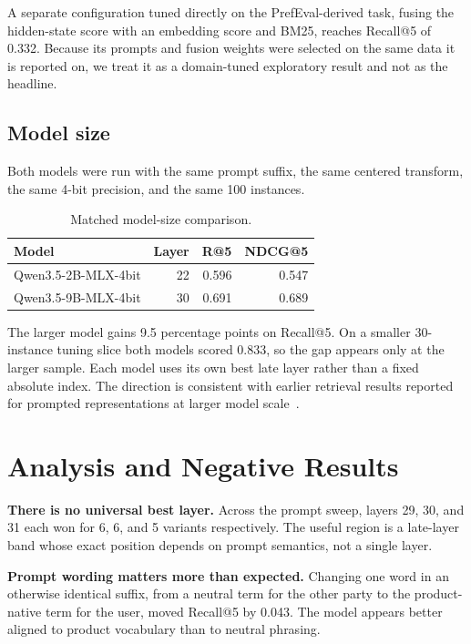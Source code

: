 \documentclass[
  10pt,
  letterpaper,
]{article}
\begin{document}
A separate configuration tuned directly on the PrefEval-derived task,
fusing the hidden-state score with an embedding score and BM25, reaches
Recall@5 of 0.332. Because its prompts and fusion weights were selected
on the same data it is reported on, we treat it as a domain-tuned
exploratory result and not as the headline.

\subsection{Model size}\label{model-size}

Both models were run with the same prompt suffix, the same centered
transform, the same 4-bit precision, and the same 100 instances.

\begin{table}[htbp]
\centering
\small
\caption{Matched model-size comparison.}
\label{tab:model-size}
\begin{tabularx}{0.8\linewidth}{@{}Xrrr@{}}
\toprule
Model & Layer & R@5 & NDCG@5 \\
\midrule
Qwen3.5-2B-MLX-4bit & 22 & 0.596 & 0.547 \\
Qwen3.5-9B-MLX-4bit & 30 & 0.691 & 0.689 \\
\bottomrule
\end{tabularx}
\end{table}

The larger model gains 9.5 percentage points on Recall@5. On a smaller
30-instance tuning slice both models scored 0.833, so the gap appears
only at the larger sample. Each model uses its own best late layer
rather than a fixed absolute index. The direction is consistent with
earlier retrieval results reported for prompted representations at
larger model scale~\cite{zhuang2024}.

\section{Analysis and Negative
Results}\label{analysis-and-negative-results}

\textbf{There is no universal best layer.} Across the prompt sweep,
layers 29, 30, and 31 each won for 6, 6, and 5 variants respectively.
The useful region is a late-layer band whose exact position depends on
prompt semantics, not a single layer.

\textbf{Prompt wording matters more than expected.} Changing one word in
an otherwise identical suffix, from a neutral term for the other party
to the product-native term for the user, moved Recall@5 by 0.043. The
model appears better aligned to product vocabulary than to neutral
phrasing.
\end{document}
